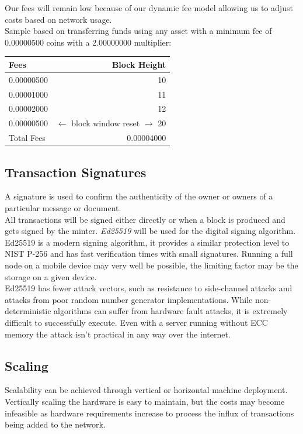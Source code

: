 \documentclass[12pt,a4paper]{article}
\begin{document}
  Our fees will remain low because of our dynamic fee model allowing us to
  adjust costs based on network usage.\\

  Sample based on transferring funds using any asset with a minimum fee of
  0.00000500 coins with a 2.00000000 multiplier:

  \vspace{3mm}
  \begin{tabular}{@{}lr@{}}
    Fees & Block Height     \\ \toprule
    0.00000500 & 10         \\
    0.00001000 & 11         \\
    0.00002000 & 12         \\
    0.00000500 & $\leftarrow{}$ block window reset $\rightarrow{}$ 20 \\ \midrule{}
    Total Fees & 0.00004000 \\
    \bottomrule
  \end{tabular}

  \subsection{Transaction Signatures}
  A signature is used to confirm the authenticity of the owner or owners
  of a particular message or document.\\

  All transactions will be signed either directly or when a block is produced
  and gets signed by the minter. \textit{Ed25519}\cite{ed25519} will be used for
  the digital signing algorithm. Ed25519 is a modern signing algorithm, it
  provides a similar protection level to NIST P-256 and has fast verification
  times with small signatures. Running a full node on a mobile device may very
  well be possible, the limiting factor may be the storage on a given device.\\

  Ed25519 has fewer attack vectors, such as resistance to side-channel attacks
  and attacks from poor random number generator implementations. While
  non-deterministic algorithms can suffer from hardware fault attacks, it is
  extremely difficult to successfully execute. Even with a server running
  without ECC memory the attack isn't practical in any way over the
  internet.

  \subsection{Scaling}
  Scalability can be achieved through vertical or horizontal machine deployment.
  Vertically scaling the hardware is easy to maintain, but the costs may become
  infeasible as hardware requirements increase to process the influx of
  transactions being added to the network.\\
\end{document}
